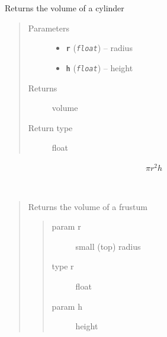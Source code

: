 \documentclass[letterpaper,10pt,english]{sphinxmanual}
\begin{document}
\begin{fulllineitems}
\begin{fulllineitems}
\end{fulllineitems}


\begin{fulllineitems}
\label{fuels_FuelCalc:fuels.FuelCalc.cylinder_volume}
Returns the volume of a cylinder
\begin{quote}\begin{description}
\item[{Parameters}] \leavevmode\begin{itemize}
\item {} 
\textbf{\texttt{r}} (\emph{\texttt{float}}) -- radius

\item {} 
\textbf{\texttt{h}} (\emph{\texttt{float}}) -- height

\end{itemize}

\item[{Returns}] \leavevmode
volume

\item[{Return type}] \leavevmode
float

\end{description}\end{quote}
\begin{equation*}
\begin{split}\pi r^2 h\end{split}
\end{equation*}
\end{fulllineitems}


\begin{fulllineitems}
\label{fuels_FuelCalc:fuels.FuelCalc.frustum_volume}~\begin{quote}

Returns the volume of a frustum
\begin{quote}\begin{description}
\item[{param r}] \leavevmode
small (top) radius

\item[{type r}] \leavevmode
float

\item[{param h}] \leavevmode
height


\end{description}
\end{quote}
\end{quote}
\end{fulllineitems}
\end{fulllineitems}
\end{document}
